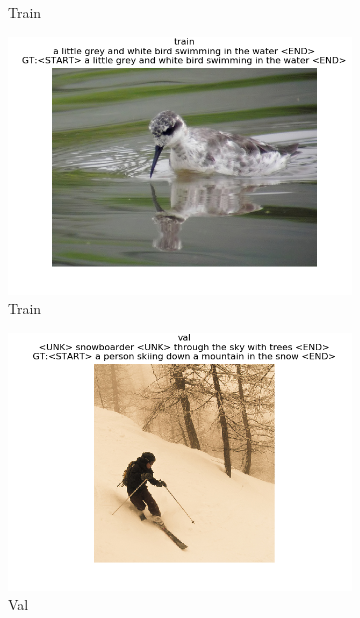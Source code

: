 \documentclass[12pt]{article}
\begin{document}
\begin{figure}[htbp]
\begin{subfigure}[t]{0.48\textwidth}
        \caption{Train}
    \label{hw2p5b}
    \end{subfigure}
    \begin{subfigure}[t]{0.48\textwidth}
        \centering
        \includegraphics[trim={3in 0in 3in 0in},scale=0.5]{./Homework2/output/hw2p5_fig03.png}
        \caption{Train}
    \label{hw2p5c}
    \end{subfigure}
    \begin{subfigure}[t]{0.48\textwidth}
        \centering
        \includegraphics[trim={3in 0in 3in 0in},scale=0.5]{./Homework2/output/hw2p5_fig04.png}
        \caption{Val}
    \label{hw2p5d}
    \end{subfigure}
    \begin{subfigure}[t]{0.48\textwidth}

\end{subfigure}
\end{figure}
\end{document}
